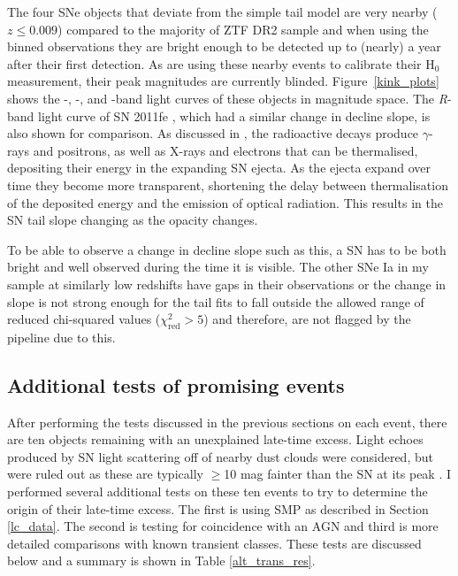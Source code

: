 \documentclass[a4paper,oneside,12pt, class=Latex/Classes/PhDthesisPSnPDF, crop=false]{standalone}
\begin{document}
The four SNe objects that deviate from the simple tail model are very nearby ($z \leq 0.009$) compared to the majority of ZTF DR2 sample and when using the binned observations they are bright enough to be detected up to (nearly) a year after their first detection. As \citet{DR2_Overview} are using these nearby events to calibrate their H$_0$ measurement, their peak magnitudes are currently blinded. Figure~\ref{kink_plots} shows the \ztfg-, \ztfr-, and \ztfi-band light curves of these objects in magnitude space. The \textit{R}-band light curve of SN 2011fe \citep{spec_Lijiang-2.4m}, which had a similar change in decline slope, is also shown for comparison. As discussed in \citet{Georgios_11fe}, the radioactive decays produce $\gamma$-rays and positrons, as well as X-rays and electrons that can be thermalised, depositing their energy in the expanding SN ejecta. As the ejecta expand over time they become more transparent, shortening the delay between thermalisation of the deposited energy and the emission of optical radiation. This results in the SN tail slope changing as the opacity changes.

To be able to observe a change in decline slope such as this, a SN has to be both bright and well observed during the time it is visible. The other SNe Ia in my sample at similarly low redshifts have gaps in their observations or the change in slope is not strong enough for the tail fits to fall outside the allowed range of reduced chi-squared values ($\chi^2_\text{red} > 5$) and therefore, are not flagged by the pipeline due to this.


\subsection{Additional tests of promising events}
\label{Additional_tests}
After performing the tests discussed in the previous sections on each event, there are ten objects remaining with an unexplained late-time excess. Light echoes produced by SN light scattering off of nearby dust clouds were considered, but were ruled out as these are typically $\geq$10 mag fainter than the SN at its peak \citep{Patat_light_echoes, 2012cg}. I performed several additional tests on these ten events to try to determine the origin of their late-time excess. The first is using SMP as described in Section \ref{lc_data}. The second is testing for coincidence with an AGN and third is more detailed comparisons with known transient classes. These tests are discussed below and a summary is shown in Table \ref{alt_trans_res}.
\end{document}
